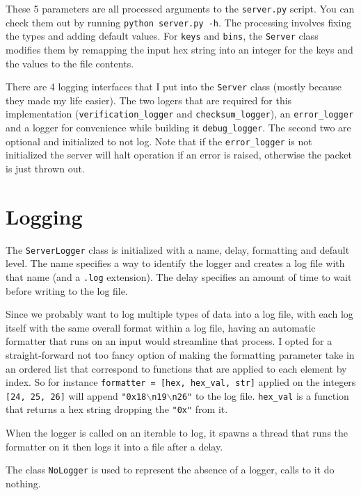 \documentclass[acmtog,review]{acmart}
\begin{document}
These 5 parameters are all processed arguments to the \texttt{server.py}
script. You can check them out by running \texttt{python server.py -h}.
The processing involves fixing the types and adding default values.
For \texttt{keys} and \texttt{bins}, the \texttt{Server} class modifies
them by remapping the input hex string into an integer for the keys
and the values to the file contents.

There are 4 logging interfaces that I put into the \texttt{Server}
class (mostly because they made my life easier). The two logers that
are required for this implementation (\texttt{verification\_logger} 
and \texttt{checksum\_logger}), an \texttt{error\_logger} and
a logger for convenience while building it \texttt{debug\_logger}.
The second two are optional and initialized to not log. Note that 
if the \texttt{error\_logger} is not initialized the server will
halt operation if an error is raised, otherwise the packet is just 
thrown out.

\section{Logging}

The \texttt{ServerLogger} class is initialized with a name, delay,
formatting and default level. The name specifies a way to identify the 
logger and creates a log file with that name (and a \texttt{.log} 
extension). The delay specifies an amount of time to wait before
writing to the log file.

Since we probably want to log multiple types of data into a log file,
with each log itself with the same overall format within a log file,
having an automatic formatter that runs on an input would streamline
that process. I opted for a straight-forward not too fancy option
of making the formatting parameter take in an ordered list that
correspond to functions that are applied to each element by index.
So for instance \texttt{formatter = [hex, hex\_val, str]} applied on
the integers \texttt{[24, 25, 26]} will append
\texttt{"0x18$\backslash$n19$\backslash$n26"} to the log file. 
\texttt{hex\_val} is a function that returns a hex string dropping 
the \texttt{"0x"} from it.

When the logger is called on an iterable to log, it spawns a thread 
that runs the formatter on it then logs it into a file after a delay.

The class \texttt{NoLogger} is used to represent the absence of a 
logger, calls to it do nothing.
\end{document}
